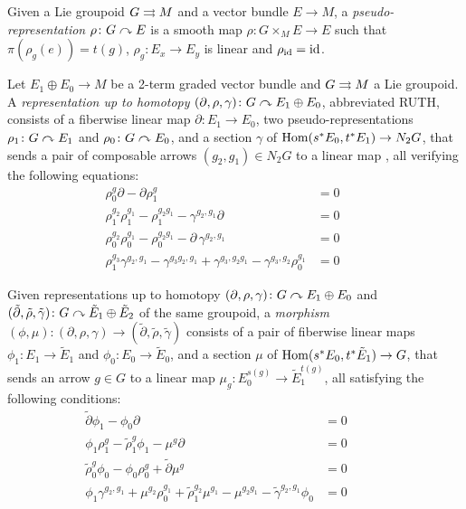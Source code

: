 %
%

Given a Lie groupoid $G\rightrightarrows M$ and a vector bundle $E\to M$, a \emph{pseudo-representation} $\rho\colon G\curvearrowright E$ is
a smooth map $\rho\colon G\times_M E\to E$
such that $\pi(\rho_g(e)) = t(g)$, $\rho_g\colon E_x\to E_y$ is linear and $\rho_{\operatorname{id}}=\operatorname{id}$.

Let $E_1\oplus E_0\to M$ be a 2-term graded vector bundle and $G\rightrightarrows M$ a Lie groupoid.
A \emph{representation up to homotopy} $(\partial, \rho, \gamma)\colon G\curvearrowright E_1\oplus E_0$, abbreviated RUTH, consists of a fiberwise linear map $\partial\colon E_1\to E_0$, two pseudo-representations $\rho_1\colon G\curvearrowright E_1$ and $\rho_0\colon G\curvearrowright E_0$, and a section $\gamma$ of $\operatorname{Hom}(s^*E_0, t^*E_1) \to N_2G$, that sends a pair of composable arrows $(g_2, g_1)\in N_2G$ to a linear map , all verifying the following equations:
\begin{align}
  \rho_0^g \partial - \partial\rho_1^g &= 0 \\
  \rho_1^{g_2}\rho_1^{g_1} - \rho_1^{g_2g_1} - \gamma^{g_2, g_1}\partial &= 0 \\
  \rho_0^{g_2}\rho_0^{g_1} - \rho_0^{g_2g_1} - \partial\,\gamma^{g_2, g_1} &= 0 \\
  \rho_1^{g_3}\gamma^{g_2, g_1} - \gamma^{g_3g_2, g_1} + \gamma^{g_3, g_2g_1} - \gamma^{g_3, g_2}\rho_0^{g_1} &=0 \qquad
\end{align}

Given representations up to homotopy $(\partial, \rho, \gamma)\colon G\curvearrowright E_1\oplus E_0$ and $(\tilde\partial, \tilde\rho, \tilde\gamma)\colon G\curvearrowright \tilde E_1\oplus \tilde E_2$ of the same groupoid, a \emph{morphism} $(\phi, \mu)\colon(\partial, \rho, \gamma)\to(\tilde\partial, \tilde\rho, \tilde\gamma)$ consists of a pair of fiberwise linear maps $\phi_1\colon E_1\to \tilde E_1$ and $\phi_0\colon E_0\to \tilde E_0$, and a section $\mu$ of $\operatorname{Hom}(s^*E_0, t^*\tilde E_1) \to G$, that sends an arrow $g\in G$ to a linear map $\mu_g\colon E_0^{s(g)}\to \tilde E_1^{t(g)}$, all satisfying the following conditions:
\begin{align}
  \tilde\partial\phi_1 - \phi_0\partial &= 0 \\
  \phi_1\rho_1^g - \tilde\rho_1^g\phi_1 - \mu^g\partial &= 0 \\
  \tilde\rho_0^g\phi_0 - \phi_0\rho_0^g + \tilde\partial\mu^g &= 0 \\
  \phi_1\gamma^{g_2, g_1} + \mu^{g_2}\rho_0^{g_1} + \tilde\rho_1^{g_2}\mu^{g_1} - \mu^{g_2g_1} - \tilde\gamma^{g_2, g_1}\phi_0 &= 0 \qquad\quad
\end{align}

